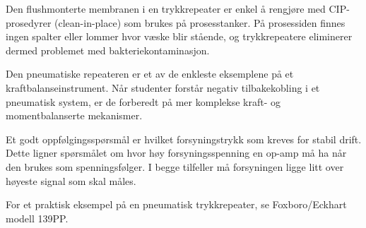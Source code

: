 Den flushmonterte membranen i en trykkrepeater er enkel å rengjøre med CIP-prosedyrer (clean-in-place) som brukes på prosesstanker.  På prosessiden finnes ingen spalter eller lommer hvor væske blir stående, og trykkrepeatere eliminerer dermed problemet med bakteriekontaminasjon.







Den pneumatiske repeateren er et av de enkleste eksemplene på et kraftbalanseinstrument.  Når studenter forstår negativ tilbakekobling i et pneumatisk system, er de forberedt på mer komplekse kraft- og momentbalanserte mekanismer.

Et godt oppfølgingsspørsmål er hvilket forsyningstrykk som kreves for stabil drift.  Dette ligner spørsmålet om hvor høy forsyningsspenning en op-amp må ha når den brukes som spenningsfølger.  I begge tilfeller må forsyningen ligge litt over høyeste signal som skal måles.

\vskip 10pt

For et praktisk eksempel på en pneumatisk trykkrepeater, se Foxboro/Eckhart modell 139PP.



